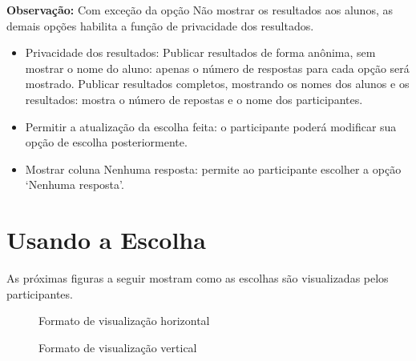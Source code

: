 \textbf{Observação:} Com exceção da opção Não mostrar os resultados aos alunos, as demais opções habilita a função de privacidade dos resultados.

\begin{itemize}
 \item 	Privacidade dos resultados:
 \subitem Publicar resultados de forma anônima, sem mostrar o nome do aluno: apenas o número de respostas para cada opção será mostrado.
 \subitem Publicar resultados completos, mostrando os nomes dos alunos e os resultados: mostra o número de repostas e o nome dos participantes.
 \item Permitir a atualização da escolha feita: o participante poderá modificar sua opção de escolha posteriormente.
 \item Mostrar coluna Nenhuma resposta: permite ao participante escolher a opção ‘Nenhuma resposta’.
\end{itemize}

\section{Usando a Escolha}

As próximas figuras a seguir mostram como as escolhas são visualizadas pelos participantes.


\begin{figure}[htbp]
 \begin{center}
  \caption{Formato de visualização horizontal}
  \label{fig:cap5_17b}
 \end{center}
\end{figure}

\begin{figure}[htbp]
 \begin{center}
  \caption{Formato de visualização vertical}
  \label{fig:cap5_18}
 \end{center}
\end{figure}

